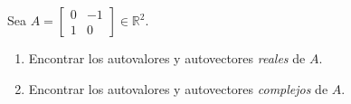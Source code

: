 \documentclass{beamer} %
\newcommand{\Id}{\operatorname{Id}}
\newcommand{\R}{\mathbb R}
\begin{document}
    
    \begin{frame}

    \begin{ejemplo} \label{ejemplo-autovalores-complejos}
    Sea $A= \begin{bmatrix}0&-1\\1&0\end{bmatrix} \in \R^2$. 
    \begin{enumerate}
        \item Encontrar los autovalores y  autovectores \textit{reales} de $A$.  
        \item Encontrar los autovalores y  autovectores \textit{complejos} de $A$.  
    \end{enumerate}
    
    \end{ejemplo}\pause
\end{frame}
\end{document}
